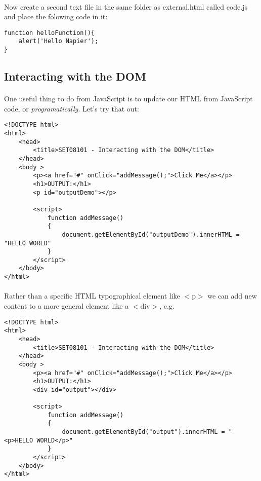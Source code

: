 \documentclass[10pt, a4paper, twosize]{article}
\begin{document}
\paragraph{} Now create a second text file in the same folder as external.html called code.js and place the folowing code in it:

\begin{lstlisting}
function helloFunction(){ 
    alert('Hello Napier'); 
}
\end{lstlisting}


\subsection{Interacting with the DOM}

\paragraph{} One useful thing to do from JavaScript is to update our HTML from JavaScript code, or \emph{programatically}. Let's try that out:

\begin{lstlisting}
<!DOCTYPE html>
<html>
    <head> 
        <title>SET08101 - Interacting with the DOM</title>
    </head>
    <body >
        <p><a href="#" onClick="addMessage();">Click Me</a></p>
        <h1>OUTPUT:</h1>
        <p id="outputDemo"></p>

        <script>
            function addMessage() 
            { 
                document.getElementById("outputDemo").innerHTML = "HELLO WORLD"
            }      
        </script>
    </body>
</html>
\end{lstlisting}

\paragraph{} Rather than a specific HTML typographical element like $<$p$>$ we can add new content to a more general element like a $<$div$>$, e.g.

\begin{lstlisting}
<!DOCTYPE html>
<html>
    <head> 
        <title>SET08101 - Interacting with the DOM</title>
    </head>
    <body >
        <p><a href="#" onClick="addMessage();">Click Me</a></p>
        <h1>OUTPUT:</h1>
        <div id="output"></div>

        <script>
            function addMessage() 
            { 
                document.getElementById("output").innerHTML = "<p>HELLO WORLD</p>"
            }      
        </script>
    </body>
</html>
\end{lstlisting}
\end{document}

